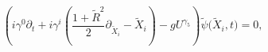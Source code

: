 \begin{equation}
\label{Dirac2}
\left( i \gamma^0 \partial_t + 
i \gamma^i \left(\frac{1+{\tilde R}^2}{2} \partial_{{\tilde X}_i} - 
{\tilde X}_i \right)
-g U^{\gamma_5}
\right)
{\tilde \psi} \big( {\tilde X}_i,t \big) = 0,
\end{equation}

